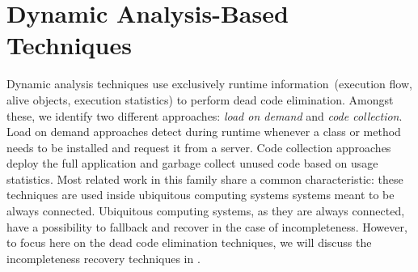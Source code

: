\section{Dynamic Analysis-Based Techniques}\label{section:dynamic_rw}

Dynamic analysis techniques use exclusively runtime information~(\ie execution flow, alive objects, execution statistics) to perform dead code elimination. Amongst these, we identify two different approaches: \emph{load on demand} and \emph{code collection}. Load on demand approaches detect during runtime whenever a class or method needs to be installed and request it from a server. Code collection approaches deploy the full application  and garbage collect unused code based on usage statistics. Most related work in this family share a common characteristic: these techniques are used inside ubiquitous computing systems \ie systems meant to be always connected. Ubiquitous computing systems, as they are always connected, have a possibility to fallback and recover in the case of incompleteness. However, to focus here on the dead code elimination techniques, we will discuss the incompleteness recovery techniques in .

